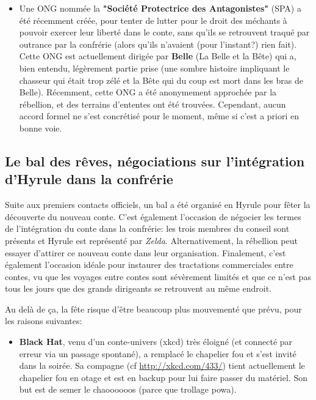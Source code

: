 {\begin{itemize}
		\item Une ONG nommée la \textbf{"Société Protectrice des Antagonistes"} (SPA) a été récemment créée, pour tenter de lutter pour le droit des méchants à pouvoir exercer leur liberté dans le conte, sans qu'ils se retrouvent traqué par outrance par la confrérie (alors qu'ils n'avaient (pour l'instant?) rien fait). Cette ONG est actuellement dirigée par \textbf{Belle} (La Belle et la Bête) qui a, bien entendu, légèrement partie prise (une sombre histoire impliquant le chasseur qui était trop zélé et la Bête qui du coup est mort dans les bras de Belle). Récemment, cette ONG a été anonymement approchée par la rébellion, et des terrains d'ententes ont été trouvées. Cependant, aucun accord formel ne s'est concrétisé pour le moment, même si c'est a priori en bonne voie.
	\end{itemize}
	
	
	\subsection{Le bal des rêves, négociations sur l'intégration d'Hyrule dans la confrérie}
	
	\par Suite aux premiers contacts officiels, un bal a été organisé en Hyrule pour fêter la découverte du nouveau conte. C'est également l'occasion de négocier les termes de l'intégration du conte dans la confrérie: les trois membres du conseil sont présents et Hyrule est représenté par \emph{Zelda}. Alternativement, la rébellion peut essayer d'attirer ce nouveau conte dans leur organisation. Finalement, c'est également l'occasion idéale pour instaurer des tractations commerciales entre contes, vu que les voyages entre contes sont sévèrement limités et que ce n'est pas tous les jours que des grands dirigeants se retrouvent au même endroit.
	
	\par Au delà de ça, la fête risque d'être beaucoup plus mouvementé que prévu, pour les raisons suivantes:
	\begin{itemize}
		\item \textbf{Black Hat}, venu d'un conte-univers (xkcd) très éloigné (et connecté par erreur via un passage spontané), a remplacé le chapelier fou et s'est invité dans la soirée. Sa compagne (cf \url{http://xkcd.com/433/}) tient actuellement le chapelier fou en otage et est en backup pour lui faire passer du matériel. Son but est de semer le chaoooooos (parce que trollage powa).
		

\end{itemize}}
